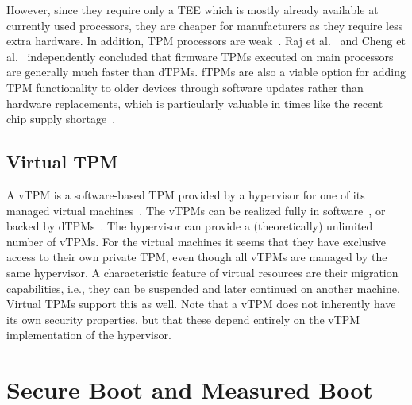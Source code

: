 
However, since they require only a \ac{TEE} which is mostly already available at currently used processors, they are cheaper for manufacturers as they require less extra hardware.
In addition, TPM processors are weak~\cite{Goh2013, Raj2015}.
Raj et al.~\cite{Raj2015} and Cheng et al.~\cite{Cheng2020} independently concluded that firmware TPMs executed on main processors are generally much faster than \acp{dTPM}.
\Acp{fTPM} are also a viable option for adding \ac{TPM} functionality to older devices through software updates rather than hardware replacements, which is particularly valuable in times like the recent chip supply shortage~\cite{Voas2021, casper2021}.




\subsection{Virtual TPM}

A vTPM is a software-based TPM provided by a hypervisor for one of its managed virtual machines~\cite{268868}.
The vTPMs can be realized fully in software~\cite{268868}, or backed by dTPMs~\cite{Liu2010}.
The hypervisor can provide a (theoretically) unlimited number of vTPMs.
For the virtual machines it seems that they have exclusive access to their own private TPM, even though all vTPMs are managed by the same hypervisor.
A characteristic feature of virtual resources are their migration capabilities, i.e., they can be suspended and later continued on another machine.
Virtual TPMs support this as well.
Note that a vTPM does not inherently have its own security properties, but that these depend entirely on the vTPM implementation of the hypervisor.


\section{Secure Boot and Measured Boot}


